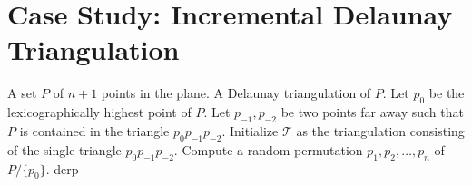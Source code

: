 \FloatBarrier
\section{Case Study: Incremental Delaunay Triangulation}


\begin{mdframed}[linecolor=white, backgroundcolor=algback, frametitle={Algorithm
Delaunay}] \begin{algorithmic}[1]
    \Require A set $P$ of $n+1$ points in the plane.
    \Ensure A Delaunay triangulation of $P$.
    \vspace{0.75em}
    \State Let $p_0$ be the lexicographically highest point of $P$.
    \State Let $p_{-1}, p_{-2}$ be two points far away such that $P$ is
    contained in the triangle $p_0p_{-1}p_{-2}$.
    \State Initialize $\mathcal{T}$ as the triangulation consisting of the
    single triangle $p_0p_{-1}p_{-2}$.
    \State Compute a random permutation $p_1, p_2, \ldots, p_n$ of $P /
    \{p_0\}$.
   \State derp
    \EndFor \EndProcedure
\end{algorithmic}
\end{mdframed} 